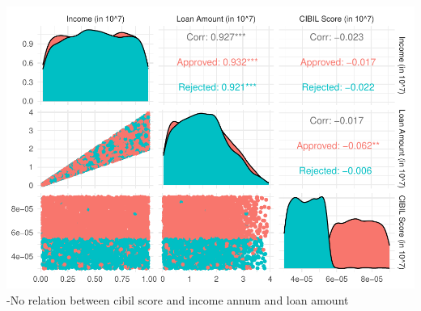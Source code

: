 \documentclass[
]{article}
\begin{document}
\includegraphics{Loan_approval_files/figure-latex/unnamed-chunk-20-1.pdf}
-No relation between cibil score and income annum and loan amount
\end{document}
